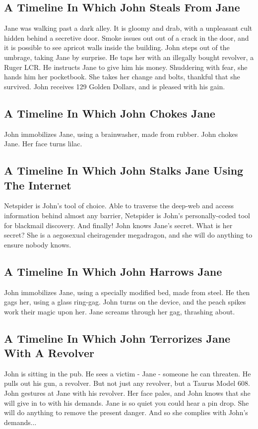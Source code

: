 \documentclass{article}
\begin{document}
\subsection{A Timeline In Which John Steals From Jane}


Jane was walking past a dark alley.
It is gloomy and drab, with a unpleasant cult hidden behind a secretive door.
Smoke issues out out of a crack in the door, and it is possible to see apricot walls inside the building.
John steps out of the umbrage, taking Jane by surprise.
He taps her with an illegally bought revolver, a Ruger LCR.
He instructs Jane to give him his money.
Shuddering with fear, she hands him her pocketbook.
She takes her change and bolts, thankful that she survived.
John receives 129 Golden Dollars, and is pleased with his gain.
\subsection{A Timeline In Which John Chokes Jane}


John immobilizes Jane, using a brainwasher, made from rubber.
John chokes Jane.
Her face turns lilac.
\subsection{A Timeline In Which John Stalks Jane Using The Internet}


Netspider is John's tool of choice. Able to traverse the deep{-}web and access information behind almost any barrier, Netspider is John's personally{-}coded tool for blackmail discovery.
And finally!
John knows Jane's secret. What is her secret? She is a aegosexual cheiragender megadragon, and she will do anything to ensure nobody knows.
\subsection{A Timeline In Which John Harrows Jane}


John immobilizes Jane, using a specially modified bed, made from steel.
He then gags her, using a glass ring{-}gag.
John turns on the device, and the peach spikes work their magic upon her.
Jane screams through her gag, thrashing about.
\subsection{A Timeline In Which John Terrorizes Jane With A Revolver}


John is sitting in the pub.
He sees a victim {-} Jane {-} someone he can threaten. He pulls out his gun, a revolver.
But not just any revolver, but a Taurus Model 608.
John gestures at Jane with his revolver. Her face pales, and John knows that she will give in to with his demands.
Jane is so quiet you could hear a pin drop. She will do anything to remove the present danger. And so she complies with John's demands...
\end{document}
